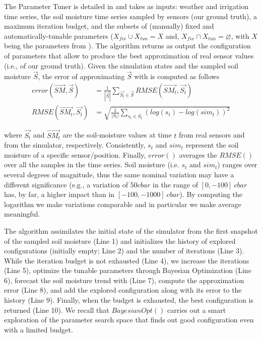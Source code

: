 The Parameter Tuner is detailed in  and takes as inputs: weather and irrigation time series, the soil moisture time series sampled by sensors (our ground truth), a maximum iteration budget, and the subsets of (manually) fixed and automatically-tunable parameters 
($X_{fix} \cup X_{tun} = X$ and, $X_{fix} \cap X_{tun} = \varnothing$, with $X$ being the parameters from ).
The algorithm returns as output the configuration of parameters that allow \olab{} to produce the best approximation of real sensor values (i.e., of our ground truth).
Given the simulation states \SMt{} and the sampled soil moisture $\overrightarrow{S}$, the error of approximating $\overrightarrow{S}$ with \SMt{} is computed as follows
\begin{align}\label{orchard-eq:error}
error(\overrightarrow{SM}, \overrightarrow{S}) &= \frac{1}{|\overrightarrow{S}|} \sum_{\overrightarrow{S_t} \in \overrightarrow{S}} RMSE(\overrightarrow{SM_t}, \overrightarrow{S_t})\\
RMSE(\overrightarrow{SM_t}, \overrightarrow{S_t}) &= \sqrt{\frac{1}{|S_t|} \sum_{s_t \in S_t} (log(s_t) - log(sim_t)) ^ 2}
\end{align}

where $\overrightarrow{S_t}$ and  $\overrightarrow{SM_t}$ are the soil-moisture values at time $t$ from real sensors and from the simulator, respectively. Consistently, $s_t$ and $sim_t$ represent the soil moisture of a specific sensor/position. Finally, $error()$ averages the $RMSE()$ over all the samples in the time series. Soil moisture (i.e. $s_t$ and $sim_t$) ranges over several degrees of magnitude, thus the same nominal variation may have a different significance (e.g., a variation of $50cbar$ in the range of $[0, -100]~cbar$ has, by far, a higher impact  than in $[-100, -1000]~cbar$). By computing the logarithm we make variations comparable and in particular we make average meaningful.

The algorithm assimilates the initial state of the simulator from the first snapshot of the sampled soil moisture (Line 1) and initializes the history of explored configurations (initially empty; Line 2) and the number of iterations (Line 3).
While the iteration budget is not exhausted (Line 4), 
we increase the iterations (Line 5),
optimize the tunable parameters through Bayesian Optimization (Line 6),
forecast the soil moisture trend with \olab{} (Line 7),
compute the approximation error (Line 8),
and add the explored configuration along with its error to the history (Line 9).
Finally, when the budget is exhausted, the best configuration is returned (Line 10). We recall that $BayesianOpt()$ carries out a smart exploration of the parameter search space that finds out good configuration even with a limited budget.

